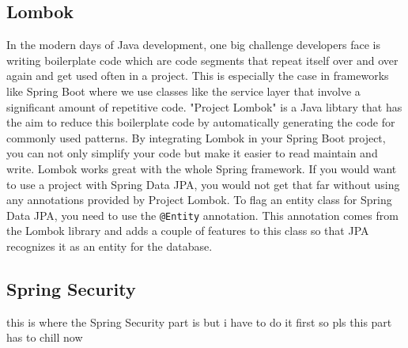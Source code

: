     \subsection{Lombok}  \newline
    In the modern days of Java development, one big challenge developers face is writing boilerplate code which are code segments that repeat itself over and over again and get used often in a project. This is especially the case in frameworks like Spring Boot where we use classes like the service layer that involve a significant amount of repetitive code.
    "Project Lombok" is a Java libtary that has the aim to reduce this boilerplate code by automatically generating the code for commonly used patterns. By integrating Lombok in your Spring Boot project, you can not only simplify your code but make it easier to read maintain and write. 
    Lombok works great with the whole Spring framework. If you would want to use a project with Spring Data JPA, you would not get that far without using any annotations provided by Project Lombok. To flag an entity class for Spring Data JPA, you need to use the \texttt{@Entity} annotation. This annotation comes from the Lombok library and adds a couple of 
    features to this class so that JPA recognizes it as an entity for the database.

    \subsection{Spring Security}
    this is where the Spring Security part is but i have to do it first so pls this part has to chill now
    
